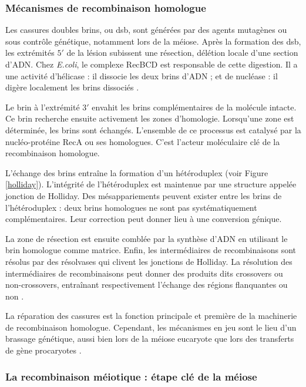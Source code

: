 \documentclass[11pt, oneside]{scrartcl}
\begin{document}
\subsubsection{Mécanismes de recombinaison homologue}
\label{sec:orgheadline2}

Les cassures doubles brins, ou \ac{dsb}, sont générées par des agents
mutagènes ou sous contrôle génétique, notamment lors de la méiose. Après la
formation des \ac{dsb}, les extrémités \(5'\) de la lésion subissent une
résection, délétion locale d'une section d'ADN. Chez \emph{E.coli}, le complexe
RecBCD est responsable de cette digestion. Il a une activité d'hélicase : il
dissocie les deux brins d'ADN ; et de nucléase : il digère localement les brins
dissociés \cite{dillingham_recbcd_2008}.

Le brin à l'extrémité \(3'\) envahit les brins complémentaires de la molécule
intacte. Ce brin recherche ensuite activement les zones d'homologie. Lorsqu'une
zone est déterminée, les brins sont échangés. L'ensemble de ce processus est
catalysé par la nucléo-protéine RecA \cite{chen_mechanism_2008} ou ses
homologues. C'est l'acteur moléculaire clé de la recombinaison homologue.

L'échange des brins entraîne la formation d'un hétéroduplex (voir Figure
\ref{holliday}). L'intégrité de l'hétéroduplex est maintenue par une structure
appelée jonction de Holliday. Des mésappariements peuvent exister entre les
brins de l'hétéroduplex : deux brins homologues ne sont pas systématiquement
complémentaires. Leur correction peut donner lieu à une conversion génique.

La zone de résection est ensuite comblée par la synthèse d'ADN en utilisant le
brin homologue comme matrice. Enfin, les intermédiaires de recombinaisons sont
résolus par des résolvases qui clivent les jonctions de Holliday. La résolution
des intermédiaires de recombinaisons peut donner des produits dits crossovers ou
non-crossovers, entraînant respectivement l'échange des régions flanquantes ou
non \cite{mancera_high-resolution_2008}.

\begin{transition}
La réparation des cassures est la fonction principale et première de la
machinerie de recombinaison homologue. Cependant, les mécanismes en jeu sont le
lieu d'un brassage génétique, aussi bien lors de la méiose eucaryote que lors
des transferts de gène procaryotes \cite{redfield_bacteria_2001}.
\end{transition}

\subsubsection{La recombinaison méiotique : étape clé de la méiose}
\label{sec:orgheadline3}
\end{document}

